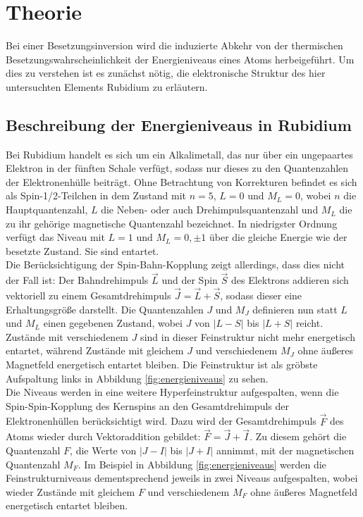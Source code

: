 \section{Theorie}
\label{sec:Theorie}
Bei einer Besetzungsinversion wird die induzierte Abkehr von der thermischen Besetzungswahrscheinlichkeit der Energieniveaus eines Atoms herbeigeführt.
Um dies zu verstehen ist es zunächst nötig, die elektronische Struktur des hier untersuchten Elements Rubidium zu erläutern.

\subsection{Beschreibung der Energieniveaus in Rubidium}
\label{subsec:energieniveaus}

Bei Rubidium handelt es sich um ein Alkalimetall, das nur über ein ungepaartes Elektron in der fünften Schale verfügt, sodass nur dieses zu den Quantenzahlen der Elektronenhülle beiträgt.
Ohne Betrachtung von Korrekturen befindet es sich als Spin-1/2-Teilchen in dem Zustand mit $n=5$, $L=0$ und $M_L=0$, wobei $n$ die Hauptquantenzahl, $L$ die Neben- oder auch Drehimpulsquantenzahl und $M_L$ die zu ihr gehörige magnetische Quantenzahl bezeichnet. In niedrigster Ordnung verfügt das Niveau mit $L=1$ und $M_L=0,\pm1$ über die gleiche Energie wie der besetzte Zustand. Sie sind entartet.\\
Die Berücksichtigung der Spin-Bahn-Kopplung zeigt allerdings, dass dies nicht der Fall ist: Der Bahndrehimpuls $\vec{L}$ und der Spin $\vec{S}$ des Elektrons addieren sich vektoriell zu einem Gesamtdrehimpuls $\vec{J}=\vec{L}+\vec{S}$, sodass dieser eine Erhaltungsgröße darstellt. Die Quantenzahlen $J$ und $M_J$ definieren nun statt $L$ und $M_L$ einen gegebenen Zustand, wobei $J$ von $\lvert L - S \rvert$ bis $\lvert L + S \rvert$ reicht. Zustände mit verschiedenem $J$ sind in dieser Feinstruktur nicht mehr energetisch entartet, während Zustände mit gleichem $J$ und verschiedenem $M_J$ ohne äußeres Magnetfeld energetisch entartet bleiben.
Die Feinstruktur ist als gröbste Aufspaltung links in Abbildung \ref{fig:energieniveaus} zu sehen.\\
Die Niveaus werden in eine weitere Hyperfeinstruktur aufgespalten, wenn die Spin-Spin-Kopplung des Kernspins an den Gesamtdrehimpuls der Elektronenhüllen berücksichtigt wird. Dazu wird der Gesamtdrehimpuls $\vec{F}$ des Atoms wieder durch Vektoraddition gebildet: $\vec{F} = \vec{J} + \vec{I}$. Zu diesem gehört die Quantenzahl $F$, die Werte von $\lvert J - I \rvert$ bis $\lvert J + I \rvert$ annimmt, mit der magnetischen Quantenzahl $M_F$. Im Beispiel in Abbildung \ref{fig:energieniveaus} werden die Feinstrukturniveaus dementsprechend jeweils in zwei Niveaus aufgespalten, wobei wieder Zustände mit gleichem $F$ und verschiedenem $M_F$ ohne äußeres Magnetfeld energetisch entartet bleiben.\\
